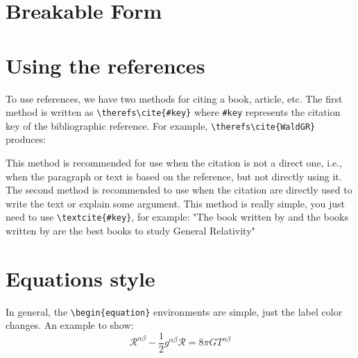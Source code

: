     
    \begin{solution}
        \lipsum[1] %
    \end{solution}
    
    \section{Breakable Form}\label{ex 2}
    \lipsum[1]
    \begin{solution}
        \lipsum[1-13]
    \end{solution}
    
    \section{Using the references}

    To use references, we have two methods for citing a book, article, etc. The first method is written as \verb|\therefs\cite{#key}| where \verb|#key| represents the citation key of the bibliographic reference. For example, \verb|\therefs\cite{WaldGR}| produces:
    \therefs\cite{WaldGR,Choquet-BruhatGR}
    
    This method is recommended for use when the citation is not a direct one, i.e., when the paragraph or text is based on the reference, but not directly using it. The second method is recommended to use when the citation are directly used to write the text or explain some argument. This method is really simple, you just need to use \verb|\textcite{#key}|, for example:
    "The book written by \textcite{WaldGR} and the books written by \textcite{Choquet-BruhatGR, Choquet-BruhatGR2} are the best books to study General Relativity"
    
    \section{Equations style}
        In general, the \verb|\begin{equation}| environments are simple, just the label color changes. An example to show:
            \begin{equation}\label{eq: 1}
                \mathcal{R}^{\alpha\beta} - \dfrac{1}{2}g^{\alpha\beta}\mathcal{R} =
                8\pi GT^{\alpha\beta}
            \end{equation}

